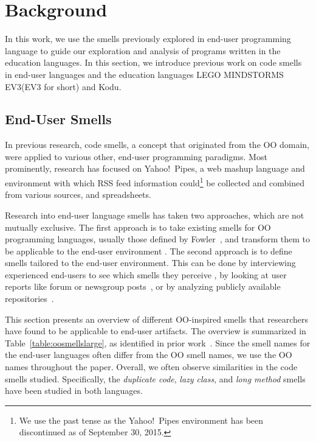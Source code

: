 \documentclass[conference]{IEEEtran}
\newcommand{\ms}{LEGO MINDSTORMS EV3}
\begin{document}
\section{Background}
\label{sec:background}
In this work, we use the smells previously explored in end-user programming language to guide our exploration and analysis of programs written in the education languages. In this section, we introduce previous work on code smells in end-user languages and the education languages  \ms  (EV3 for short) and Kodu.

\subsection{End-User Smells}
In previous research, code smells, a concept that originated from the OO domain, were applied to various other, end-user programming paradigms. 
Most prominently, research has focused on Yahoo!\ Pipes, a web mashup language and environment with which RSS feed information could\footnote{We use the past tense as the Yahoo!\ Pipes environment has been discontinued as of September 30, 2015.} be collected and combined from various sources, and spreadsheets.

Research into end-user language smells has taken two approaches, which are not mutually exclusive. The first approach is to take existing smells for OO programming languages, usually those defined by Fowler~\cite{Fowl1999}, and transform them to be applicable to the end-user environment \cite{Hermans2012inter,Hermans2012intra,Stolee2011,StoleeTSE2013, chambers2013smell}. The second approach is to define smells tailored to the end-user environment. This can be done by interviewing experienced end-users to see which smells they perceive \cite{chambers2013smell}, by looking at user reports like forum or newsgroup posts~\cite{badame2012refactoring,chambers2013smell}, or by analyzing publicly available repositories~\cite{Stolee2011,StoleeTSE2013,Hermans2012intra}.

This section presents an overview of different OO-inspired smells that researchers have found to be applicable to end-user artifacts. The overview is summarized in Table~\ref{table:oosmellslarge}, as identified in prior work~\cite{Stolee2011,StoleeTSE2013,Hermans2012intra, Hermans2012inter}.
 Since the smell names for the end-user languages often differ from the OO smell names, we use the OO names throughout the paper. Overall, we often observe similarities in the code smells studied. Specifically, the \emph{duplicate code}, \emph{lazy class}, and \emph{long method} smells  have been studied in both languages.  
 
\end{document}
